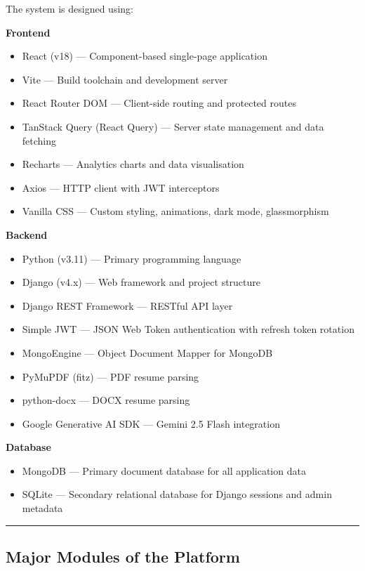\documentclass[12pt]{article}
\begin{document}
The system is designed using:

\textbf{Frontend}
\begin{itemize}
  \item React (v18) — Component-based single-page application
  \item Vite — Build toolchain and development server
  \item React Router DOM — Client-side routing and protected routes
  \item TanStack Query (React Query) — Server state management and data fetching
  \item Recharts — Analytics charts and data visualisation
  \item Axios — HTTP client with JWT interceptors
  \item Vanilla CSS — Custom styling, animations, dark mode, glassmorphism
\end{itemize}

\textbf{Backend}
\begin{itemize}
  \item Python (v3.11) — Primary programming language
  \item Django (v4.x) — Web framework and project structure
  \item Django REST Framework — RESTful API layer
  \item Simple JWT — JSON Web Token authentication with refresh token rotation
  \item MongoEngine — Object Document Mapper for MongoDB
  \item PyMuPDF (fitz) — PDF resume parsing
  \item python-docx — DOCX resume parsing
  \item Google Generative AI SDK — Gemini 2.5 Flash integration
\end{itemize}

\textbf{Database}
\begin{itemize}
  \item MongoDB — Primary document database for all application data
  \item SQLite — Secondary relational database for Django sessions and admin metadata
\end{itemize}

\noindent\rule{\textwidth}{0.4pt}

\subsection{Major Modules of the Platform}
\end{document}
